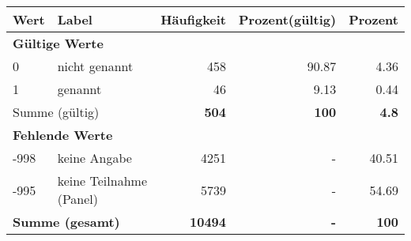      \begin{longtable}{lXrrr}
     \toprule
     \textbf{Wert} & \textbf{Label} & \textbf{Häufigkeit} & \textbf{Prozent(gültig)} & \textbf{Prozent} \\
     \endhead
     \midrule
     \multicolumn{5}{l}{\textbf{Gültige Werte}}\\

     0 &
     \multicolumn{1}{X}{ nicht genannt   } &


       \num{458} &
       \num[round-mode=places,round-precision=2]{90,87} &
         \num[round-mode=places,round-precision=2]{4,36} \\

     1 &
     \multicolumn{1}{X}{ genannt   } &


       \num{46} &
       \num[round-mode=places,round-precision=2]{9,13} &
         \num[round-mode=places,round-precision=2]{0,44} \\
     \midrule
     \multicolumn{2}{l}{Summe (gültig)} &
       \textbf{\num{504}} &
     \textbf{100} &
       \textbf{\num[round-mode=places,round-precision=2]{4,8}} \\
     \multicolumn{5}{l}{\textbf{Fehlende Werte}}\\
       -998 &
       keine Angabe &
         \num{4251} &
        - &
         \num[round-mode=places,round-precision=2]{40,51} \\
       -995 &
       keine Teilnahme (Panel) &
         \num{5739} &
        - &
         \num[round-mode=places,round-precision=2]{54,69} \\
     \midrule
     \multicolumn{2}{l}{\textbf{Summe (gesamt)}} &
          \textbf{\num{10494}} &
        \textbf{-} &
        \textbf{100} \\
     \bottomrule
     \end{longtable}
     

